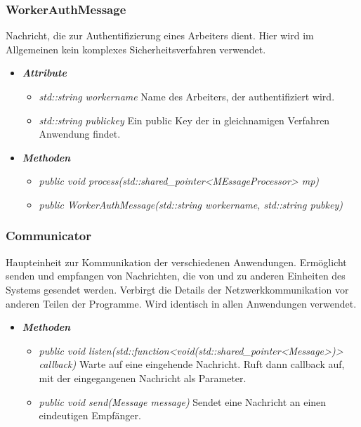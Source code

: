 \documentclass[a4paper,12pt]{article}
\begin{document}
\subsubsection{WorkerAuthMessage}

Nachricht, die zur Authentifizierung eines Arbeiters dient. Hier wird im Allgemeinen kein komplexes Sicherheitsverfahren verwendet.

	\begin{itemize}[label={}]

	\item\textit{\textbf{Attribute}}
		\begin{itemize}[label={\textbullet}]
			\item\textit{std::string workername} Name des Arbeiters, der authentifiziert wird.
			\item\textit{std::string publickey} Ein public Key der in gleichnamigen Verfahren Anwendung findet.
		\end{itemize}

	\item\textit{\textbf{Methoden}}
		\begin{itemize}[label={\textbullet}]
			\item\textit{public void process(std::shared\_pointer<MEssageProcessor> mp)}
			\item\textit{public WorkerAuthMessage(std::string workername, std::string pubkey)}
		\end{itemize}

\end{itemize}


\subsubsection{Communicator}

Haupteinheit zur Kommunikation der verschiedenen Anwendungen. Ermöglicht senden und empfangen von Nachrichten, die von und zu anderen Einheiten des Systems gesendet werden. Verbirgt die Details der Netzwerkkommunikation vor anderen Teilen der Programme. Wird identisch in allen Anwendungen verwendet.

	\begin{itemize}[label={}]

	\item\textit{\textbf{Methoden}}
		\begin{itemize}[label={\textbullet}]
			\item\textit{public void listen(std::function<void(std::shared\_pointer<Message>)> callback)} Warte auf eine eingehende Nachricht. Ruft dann callback auf, mit der eingegangenen Nachricht als Parameter.
			\item\textit{public void send(Message message)} Sendet eine Nachricht an einen eindeutigen Empfänger.

		\end{itemize}

\end{itemize}
\end{document}
